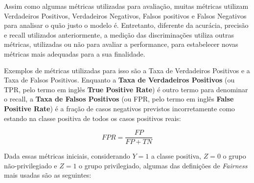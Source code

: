 \documentclass[Portugues,Final]{ic-tese-v3}
\begin{document}
Assim como algumas métricas utilizadas para avaliação, muitas métricas utilizam Verdadeiros Positivos, Verdadeiros Negativos, Falsos positivos e Falsos Negativos para analisar o quão justo o modelo é. Entretanto, diferente da acurácia, precisão e recall utilizados anteriormente, a medição das discriminações utiliza outras métricas, utilizadas ou não para avaliar a performance, para estabelecer novas métricas mais adequadas para a sua finalidade.

Exemplos de métricas utilizadas para isso são a Taxa de Verdadeiros Positivos e a Taxa de Falsos Positivos. Enquanto a \textbf{Taxa de Verdadeiros Positivos} (ou TPR, pelo termo em inglês \textbf{True Positive Rate}) é outro termo para denominar o recall, a \textbf{Taxa de Falsos Positivos} (ou FPR, pelo termo em inglês \textbf{False Positive Rate}) é a fração de casos negativos previstos incorretamente como estando na classe positiva de todos os casos positivos reais:

\begin{equation}
FPR = \frac{FP}{FP + TN}
\end{equation}

Dada essas métricas iniciais, considerando $Y=1$ a classe positiva, $Z=0$ o grupo não-privilegiado e $Z=1$ o grupo privilegiado, algumas das definições de \textit{Fairness} mais usadas são as seguintes:
\end{document}

